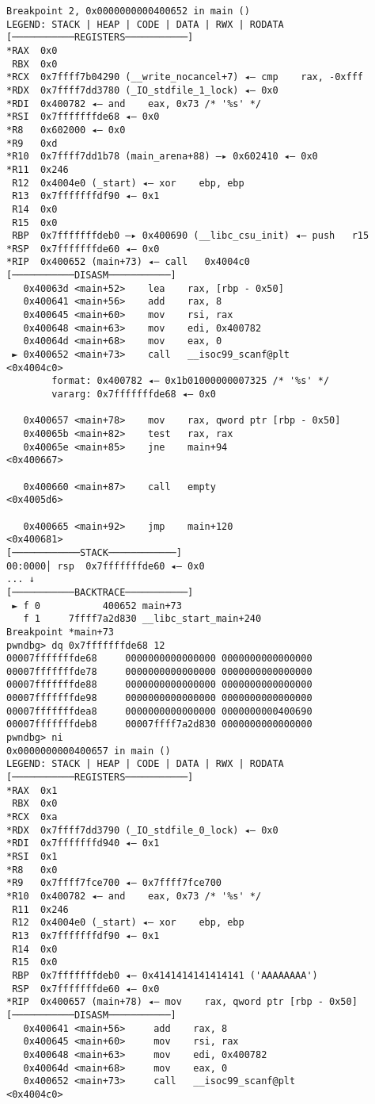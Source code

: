 \begin{lstlisting}
Breakpoint 2, 0x0000000000400652 in main ()
LEGEND: STACK | HEAP | CODE | DATA | RWX | RODATA
[───────────REGISTERS───────────]
*RAX  0x0
 RBX  0x0
*RCX  0x7ffff7b04290 (__write_nocancel+7) ◂— cmp    rax, -0xfff
*RDX  0x7ffff7dd3780 (_IO_stdfile_1_lock) ◂— 0x0
*RDI  0x400782 ◂— and    eax, 0x73 /* '%s' */
*RSI  0x7fffffffde68 ◂— 0x0
*R8   0x602000 ◂— 0x0
*R9   0xd
*R10  0x7ffff7dd1b78 (main_arena+88) —▸ 0x602410 ◂— 0x0
*R11  0x246
 R12  0x4004e0 (_start) ◂— xor    ebp, ebp
 R13  0x7fffffffdf90 ◂— 0x1
 R14  0x0
 R15  0x0
 RBP  0x7fffffffdeb0 —▸ 0x400690 (__libc_csu_init) ◂— push   r15
*RSP  0x7fffffffde60 ◂— 0x0
*RIP  0x400652 (main+73) ◂— call   0x4004c0
[───────────DISASM───────────]
   0x40063d <main+52>    lea    rax, [rbp - 0x50]
   0x400641 <main+56>    add    rax, 8
   0x400645 <main+60>    mov    rsi, rax
   0x400648 <main+63>    mov    edi, 0x400782
   0x40064d <main+68>    mov    eax, 0
 ► 0x400652 <main+73>    call   __isoc99_scanf@plt            <0x4004c0>
        format: 0x400782 ◂— 0x1b01000000007325 /* '%s' */
        vararg: 0x7fffffffde68 ◂— 0x0
 
   0x400657 <main+78>    mov    rax, qword ptr [rbp - 0x50]
   0x40065b <main+82>    test   rax, rax
   0x40065e <main+85>    jne    main+94                       <0x400667>
 
   0x400660 <main+87>    call   empty                         <0x4005d6>
 
   0x400665 <main+92>    jmp    main+120                      <0x400681>
[────────────STACK────────────]
00:0000│ rsp  0x7fffffffde60 ◂— 0x0
... ↓
[───────────BACKTRACE───────────]
 ► f 0           400652 main+73
   f 1     7ffff7a2d830 __libc_start_main+240
Breakpoint *main+73
pwndbg> dq 0x7fffffffde68 12
00007fffffffde68     0000000000000000 0000000000000000
00007fffffffde78     0000000000000000 0000000000000000
00007fffffffde88     0000000000000000 0000000000000000
00007fffffffde98     0000000000000000 0000000000000000
00007fffffffdea8     0000000000000000 0000000000400690
00007fffffffdeb8     00007ffff7a2d830 0000000000000000
pwndbg> ni
0x0000000000400657 in main ()
LEGEND: STACK | HEAP | CODE | DATA | RWX | RODATA
[───────────REGISTERS───────────]
*RAX  0x1
 RBX  0x0
*RCX  0xa
*RDX  0x7ffff7dd3790 (_IO_stdfile_0_lock) ◂— 0x0
*RDI  0x7fffffffd940 ◂— 0x1
*RSI  0x1
*R8   0x0
*R9   0x7ffff7fce700 ◂— 0x7ffff7fce700
*R10  0x400782 ◂— and    eax, 0x73 /* '%s' */
 R11  0x246
 R12  0x4004e0 (_start) ◂— xor    ebp, ebp
 R13  0x7fffffffdf90 ◂— 0x1
 R14  0x0
 R15  0x0
 RBP  0x7fffffffdeb0 ◂— 0x4141414141414141 ('AAAAAAAA')
 RSP  0x7fffffffde60 ◂— 0x0
*RIP  0x400657 (main+78) ◂— mov    rax, qword ptr [rbp - 0x50]
[───────────DISASM───────────]
   0x400641 <main+56>     add    rax, 8
   0x400645 <main+60>     mov    rsi, rax
   0x400648 <main+63>     mov    edi, 0x400782
   0x40064d <main+68>     mov    eax, 0
   0x400652 <main+73>     call   __isoc99_scanf@plt            <0x4004c0>
 

\end{lstlisting}
